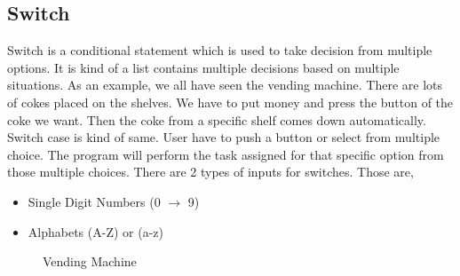 \documentclass[A4 paper,openany]{book}  %
\begin{document}
\subsection{Switch}
Switch is a conditional statement which is used to take decision from multiple options. It is kind of a list contains multiple decisions based on multiple situations.
As an example, we all have seen the vending machine. There are lots of cokes placed on the shelves. We have to put money and press the button of the coke we want. Then the
coke from a specific shelf comes down automatically. Switch case is kind of same. User have to push a button or select from multiple choice. The program will perform the task
assigned for that specific option from those multiple choices. There are 2 types of inputs for switches. Those are,
\begin{itemize}
    \item Single Digit Numbers (0 $\to$ 9)
    \item Alphabets (A-Z) or (a-z)
\end{itemize}
% 
% 
\begin{figure}[htbp]
    \begin{center}
        \caption{Vending Machine\cite{Ref10}}
    \end{center}
\end{figure}
% 
%
\end{document}
